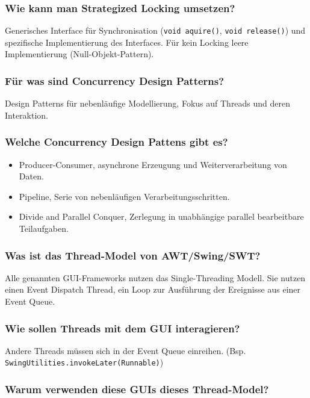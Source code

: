 \documentclass[10pt,a4paper]{scrartcl}
\begin{document}
\subsubsection{Wie kann man Strategized Locking umsetzen?}

Generisches Interface für Synchronisation (\texttt{void aquire()}, \texttt{void release()}) und
spezifische Implementierung des Interfaces. Für kein Locking leere Implementierung (Null-Objekt-Pattern).
  
\subsubsection{Für was sind Concurrency Design Patterns?}

Design Patterns für nebenläufige Modellierung, Fokus auf Threads und deren Interaktion.
  
\subsubsection{Welche Concurrency Design Pattens gibt es?}

\begin{itemize}
	\item Producer-Consumer, asynchrone Erzeugung und Weiterverarbeitung von Daten.
	\item Pipeline, Serie von nebenläufigen Verarbeitungsschritten.
	\item Divide and Parallel Conquer, Zerlegung in unabhängige parallel bearbeitbare Teilaufgaben.
\end{itemize}
  
\subsubsection{Was ist das Thread-Model von AWT/Swing/SWT?}

Alle genannten GUI-Frameworks nutzen das Single-Threading Modell. Sie nutzen einen Event Dispatch
Thread, ein Loop zur Ausführung der Ereignisse aus einer Event Queue.
  
\subsubsection{Wie sollen Threads mit dem GUI interagieren?}

Andere Threads müssen sich in der Event Queue einreihen. (Bsp. \texttt{SwingUtilities.invokeLater(Runnable)})
  
\subsubsection{Warum verwenden diese GUIs dieses Thread-Model?}
\end{document}

